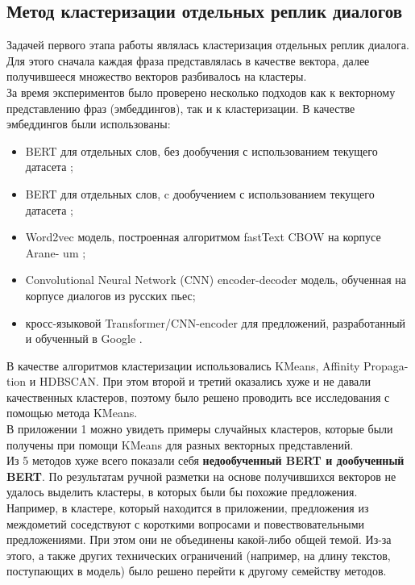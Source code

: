 \documentclass[a4paper,14pt]{article}
\begin{document}
\begin{center}
	\section*{Метод кластеризации отдельных реплик диалогов}
\end{center}
\begin{justify}
\indent
Задачей первого этапа работы являлась кластеризация отдельных реплик диалога. Для этого сначала каждая фраза представлялась в качестве вектора, далее получившееся множество векторов разбивалось на кластеры.\\
\indent
За время экспериментов было проверено несколько подходов как к векторному представлению фраз (эмбеддингов),  так и к кластеризации. В качестве эмбеддингов были использованы:
\begin{itemize}
  \item BERT для отдельных слов, без дообучения с использованием текущего датасета \cite{bert-deeppavlov};
  \item BERT для отдельных слов, c дообучением с использованием текущего датасета \cite{bert-deeppavlov};
  \item Word2vec модель, построенная алгоритмом fastText CBOW на корпусе Arane- um \cite{rusvectores-models};
  \item Convolutional Neural Network (CNN) encoder-decoder модель, обученная на корпусе диалогов из русских пьес;
  \item кросс-языковой Transformer/CNN-encoder для предложений, разработанный и обученный в Google \cite{tf-encoder}.
\end{itemize} 
\indent
В качестве алгоритмов кластеризации использовались KMeans, Affinity Propaga- tion и HDBSCAN. При этом второй и третий оказались хуже и не давали качественных кластеров, поэтому было решено проводить все исследования с помощью метода KMeans. \\
\indent
В приложении 1 можно увидеть примеры случайных кластеров, которые были получены при помощи KMeans для разных векторных представлений.\\
\indent
Из 5 методов хуже всего показали себя \textbf{недообученный BERT и дообученный BERT}. По результатам ручной разметки на основе получившихся векторов не удалось выделить кластеры, в которых были бы похожие предложения. Например, в кластере, который находится в приложении, предложения из междометий соседствуют с короткими вопросами и повествовательными предложениями. При этом они не объединены какой-либо общей темой. Из-за этого, а также других технических ограничений (например, на длину текстов, поступающих в модель) было решено перейти к другому семейству методов.\\

\end{justify}
\end{document}

